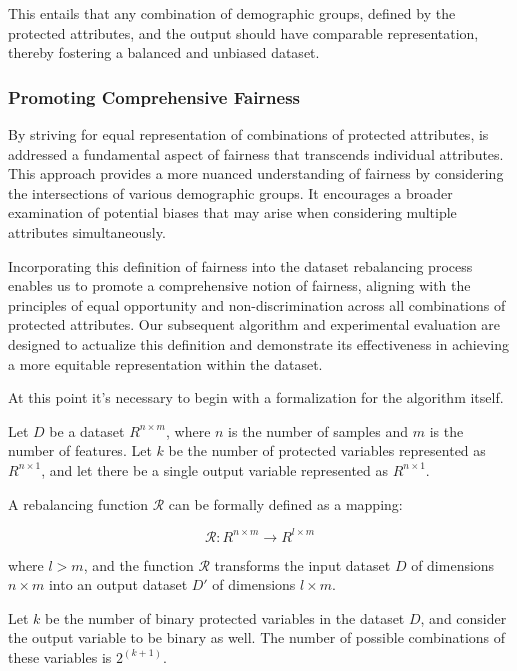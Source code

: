 This entails that any combination of demographic groups, defined by the protected attributes, and the output should have comparable representation, thereby fostering a balanced and unbiased dataset.

\subsubsection{Promoting Comprehensive Fairness}

By striving for equal representation of combinations of protected attributes, is addressed a fundamental aspect of fairness that transcends individual attributes. This approach provides a more nuanced understanding of fairness by considering the intersections of various demographic groups. It encourages a broader examination of potential biases that may arise when considering multiple attributes simultaneously.

Incorporating this definition of fairness into the dataset rebalancing process enables us to promote a comprehensive notion of fairness, aligning with the principles of equal opportunity and non-discrimination across all combinations of protected attributes. Our subsequent algorithm and experimental evaluation are designed to actualize this definition and demonstrate its effectiveness in achieving a more equitable representation within the dataset.

At this point it's necessary to begin with a formalization for the algorithm itself.


Let \( D \) be a dataset \( R^{n \times m} \), where \( n \) is the number of samples and \( m \) is the number of features. Let \( k \) be the number of protected variables represented as \( R^{n \times 1} \), and let there be a single output variable represented as \( R^{n \times 1} \).

A rebalancing function \( \mathcal{R} \) can be formally defined as a mapping:

\[
\mathcal{R}: R^{n \times m} \rightarrow R^{l \times m}
\]

where \( l > m \), and the function \( \mathcal{R} \) transforms the input dataset \( D \) of dimensions \( n \times m \) into an output dataset \( D' \) of dimensions \( l \times m \).



Let \( k \) be the number of binary protected variables in the dataset \( D \), and consider the output variable to be binary as well. The number of possible combinations of these variables is \( 2^{(k+1)} \).

